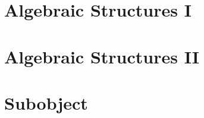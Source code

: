 \section{Algebraic Structures I}








\section{Algebraic Structures II}







\section{Subobject}
